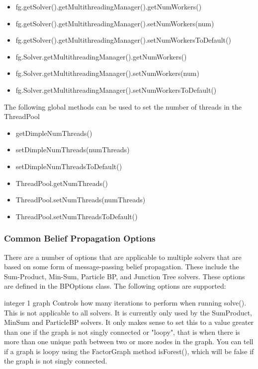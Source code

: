 \ifjava
\begin{itemize}
\item fg.getSolver().getMultithreadingManager().getNumWorkers()
\item fg.getSolver().getMultithreadingManager().setNumWorkers(num)
\item fg.getSolver().getMultithreadingManager().setNumWorkersToDefault()
\end{itemize}
\fi

\ifmatlab
\begin{itemize}
\item fg.Solver.getMultithreadingManager().getNumWorkers()
\item fg.Solver.getMultithreadingManager().setNumWorkers(num)
\item fg.Solver.getMultithreadingManager().setNumWorkersToDefault()
\end{itemize}
\fi

The following global methods can be used to set the number of threads in the ThreadPool

\ifmatlab
\begin{itemize}
\item getDimpleNumThreads()
\item setDimpleNumThreads(numThreads)
\item setDimpleNumThreadsToDefault()
\end{itemize}
\fi

\ifjava
\begin{itemize}
\item ThreadPool.getNumThreads()
\item ThreadPool.setNumThreads(numThreads)
\item ThreadPool.setNumThreadsToDefault()
\end{itemize}
\fi

\clearpage
\subsubsection{Common Belief Propagation Options}
\label{sec:BPOptions}

There are a number of options that are applicable to multiple solvers that are based on some form of message-passing belief propagation. These include the Sum-Product, Min-Sum, Particle BP, and Junction Tree solvers. These options are defined in the BPOptions class. The following options are supported:


{integer}
{1}
{graph}
{Controls how many iterations to perform when running solve(). This is not applicable to all solvers. It is currently only used by the SumProduct, MinSum and ParticleBP solvers. It only makes sense to set this to a value greater than one if the graph is not singly connected or "loopy", that is when there is more than one unique path between two or more nodes in the graph. You can tell if a graph is loopy using the FactorGraph method isForest(), which will be false if the graph is not singly connected.}

